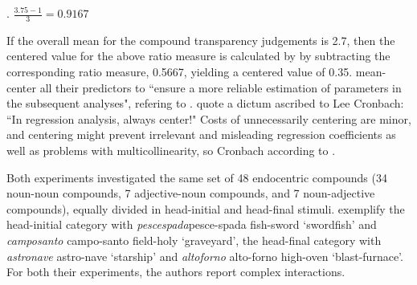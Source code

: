 \ex. $\frac{3.75-1}{3} = 0.9167$

If the overall mean for the compound transparency judgements is 2.7,
then the centered value for the above ratio measure is calculated by by subtracting
the corresponding ratio measure, 0.5667, yielding a centered value
of 0.35. \citet[648]{MarelliandLuzzatti:2012} mean-center all their
predictors to ``ensure a more reliable estimation of parameters in the
subsequent analyses", refering to
\citet{KraemerandBlasey:2004}. 
\citet[141]{KraemerandBlasey:2004} quote a dictum ascribed to Lee
Cronbach: ``In regression analysis, always center!" Costs of
unnecessarily centering are minor, and centering might prevent
irrelevant and misleading regression coefficients as well as problems
with multicollinearity, so Cronbach according to \citet[141]{KraemerandBlasey:2004}.

Both experiments investigated the same set of 48 endocentric
compounds (34 noun-noun compounds, 7 adjective-noun compounds, and
7 noun-adjective compounds), equally divided in
head-initial and head-final
stimuli. \citet[647]{MarelliandLuzzatti:2012} exemplify the
head-initial category with \emph{pescespada}\linebreak[3] pesce-spada fish-sword
`swordfish' and \emph{camposanto} campo-santo field-holy `graveyard',
the head-final category with \emph{astronave} astro-nave `starship' and
\emph{altoforno} alto-forno high-oven `blast-furnace'. For both their
experiments, the authors report complex interactions.

